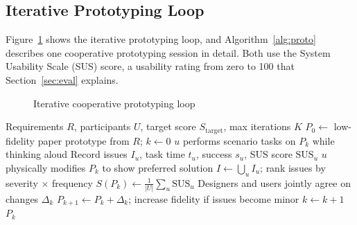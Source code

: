 \documentclass[a4paper,12pt]{article}
\begin{document}
\subsection{Iterative Prototyping Loop}
Figure~\ref{fig:protoloop} shows the iterative prototyping loop, and Algorithm~\ref{alg:proto} describes one cooperative prototyping session in detail. Both use the System Usability Scale (SUS) score, a usability rating from zero to 100 that Section~\ref{sec:eval} explains.
\begin{figure}[H]
\centering
{}
\caption{Iterative cooperative prototyping loop}
\label{fig:protoloop}
\end{figure}

\begin{algorithm}[H]
\caption{Cooperative Prototyping Session}
\label{alg:proto}
\begin{algorithmic}[1]
\Require Requirements $R$, participants $U$, target score $S_{\text{target}}$, max iterations $K$
\State $P_0 \gets$ low-fidelity paper prototype from $R$; $k \gets 0$
\Repeat
        \State $u$ performs scenario tasks on $P_k$ while thinking aloud
        \State Record issues $I_u$, task time $t_u$, success $s_u$, SUS score $\text{SUS}_u$
        \State $u$ physically modifies $P_k$ to show preferred solution
    \EndFor
    \State $I \gets \bigcup_{u} I_u$; rank issues by severity $\times$ frequency
    \State $S(P_k) \gets \frac{1}{|U|}\sum_u \text{SUS}_u$
    \State Designers and users jointly agree on changes $\Delta_k$
    \State $P_{k+1} \gets P_k + \Delta_k$; increase fidelity if issues become minor
    \State $k \gets k+1$
\State \Return $P_k$
\end{algorithmic}
\end{algorithm}
\end{document}
